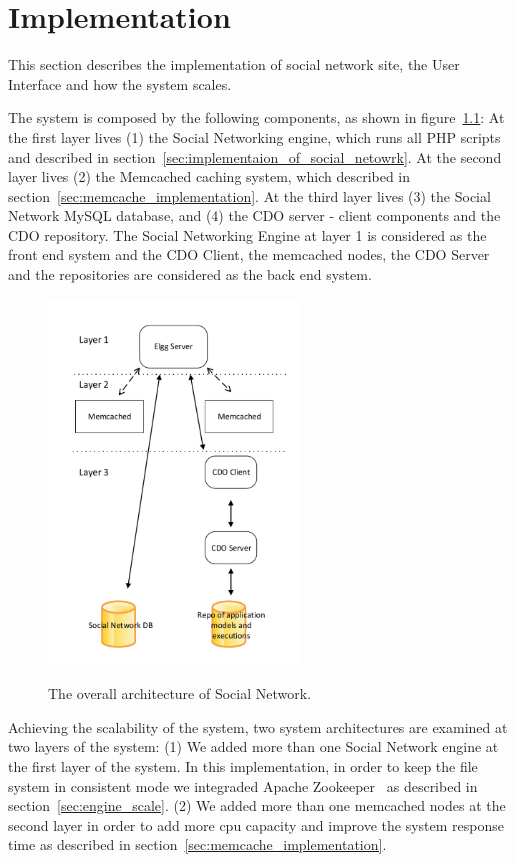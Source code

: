 
\chapter{Implementation}
\label{chap:implementation}
This section describes the implementation of social network site, the User Interface and how the system scales.

The system is composed by the following components, as shown in figure~\ref{fig:system_architecture}: At the first layer lives (1) the Social Networking engine, which runs all PHP scripts and described in section~\ref{sec:implementaion_of_social_netowrk}. At the second layer lives (2) the Memcached caching system, which described in section~\ref{sec:memcache_implementation}. At the third layer lives (3) the Social Network MySQL database, and (4) the CDO server - client components and the CDO repository. The Social Networking Engine at layer 1 is considered as the front end system and the CDO Client, the memcached nodes, the CDO Server and the repositories are considered as the back end system. 

\begin{figure}[h]
	\caption{The overall architecture of Social Network.}
	\includegraphics[width=0.6\textwidth,natwidth=200,natheight=150]{./fig/system_architecture.pdf}
	\centering
	\label{fig:system_architecture}
\end{figure}

Achieving the scalability of the system, two system architectures are examined at two layers of the system: (1) We added more than one Social Network engine at the first layer of the system. In this implementation, in order to keep the file system in consistent mode we integraded Apache Zookeeper~\cite{zookeeper_url} as described in section~\ref{sec:engine_scale}. (2) We added more than one memcached nodes at the second layer in order to add more cpu capacity and improve the system response time as described in section~\ref{sec:memcache_implementation}.

